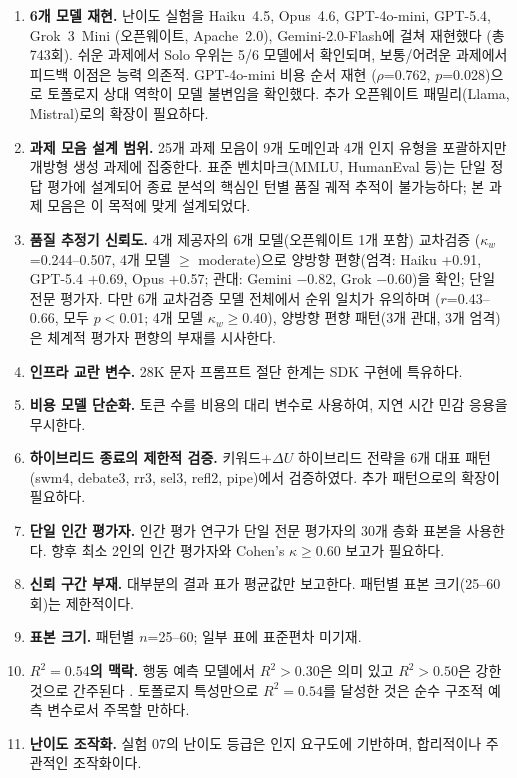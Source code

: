 \documentclass[a4paper,11pt]{article}
\begin{document}
\begin{enumerate}
\item \textbf{6개 모델 재현.} 난이도 실험을 Haiku~4.5, Opus~4.6, GPT-4o-mini, GPT-5.4, Grok~3~Mini (오픈웨이트, Apache~2.0), Gemini-2.0-Flash에 걸쳐 재현했다 (총 743회). 쉬운 과제에서 Solo 우위는 5/6 모델에서 확인되며, 보통/어려운 과제에서 피드백 이점은 능력 의존적. GPT-4o-mini 비용 순서 재현 ($\rho$=0.762, $p$=0.028)으로 토폴로지 상대 역학이 모델 불변임을 확인했다. 추가 오픈웨이트 패밀리(Llama, Mistral)로의 확장이 필요하다.

\item \textbf{과제 모음 설계 범위.} 25개 과제 모음이 9개 도메인과 4개 인지 유형을 포괄하지만 개방형 생성 과제에 집중한다. 표준 벤치마크(MMLU, HumanEval 등)는 단일 정답 평가에 설계되어 종료 분석의 핵심인 턴별 품질 궤적 추적이 불가능하다; 본 과제 모음은 이 목적에 맞게 설계되었다.

\item \textbf{품질 추정기 신뢰도.} 4개 제공자의 6개 모델(오픈웨이트 1개 포함) 교차검증 ($\kappa_w$=0.244--0.507, 4개 모델 $\geq$ moderate)으로 양방향 편향(엄격: Haiku +0.91, GPT-5.4 +0.69, Opus +0.57; 관대: Gemini $-$0.82, Grok $-$0.60)을 확인; 단일 전문 평가자. 다만 6개 교차검증 모델 전체에서 순위 일치가 유의하며 ($r$=0.43--0.66, 모두 $p<$0.01; 4개 모델 $\kappa_w \geq 0.40$), 양방향 편향 패턴(3개 관대, 3개 엄격)은 체계적 평가자 편향의 부재를 시사한다.

\item \textbf{인프라 교란 변수.} 28K 문자 프롬프트 절단 한계는 SDK 구현에 특유하다.

\item \textbf{비용 모델 단순화.} 토큰 수를 비용의 대리 변수로 사용하여, 지연 시간 민감 응용을 무시한다.

\item \textbf{하이브리드 종료의 제한적 검증.} 키워드+$\Delta U$ 하이브리드 전략을 6개 대표 패턴(swm4, debate3, rr3, sel3, refl2, pipe)에서 검증하였다. 추가 패턴으로의 확장이 필요하다.

\item \textbf{단일 인간 평가자.} 인간 평가 연구가 단일 전문 평가자의 30개 층화 표본을 사용한다. 향후 최소 2인의 인간 평가자와 Cohen's $\kappa \geq 0.60$ 보고가 필요하다.

\item \textbf{신뢰 구간 부재.} 대부분의 결과 표가 평균값만 보고한다. 패턴별 표본 크기(25--60회)는 제한적이다.

\item \textbf{표본 크기.} 패턴별 $n$=25--60; 일부 표에 표준편차 미기재.

\item \textbf{$R^{2}=0.54$의 맥락.} 행동 예측 모델에서 $R^{2}>0.30$은 의미 있고 $R^{2}>0.50$은 강한 것으로 간주된다 \citep{cohen1988}. 토폴로지 특성만으로 $R^{2}=0.54$를 달성한 것은 순수 구조적 예측 변수로서 주목할 만하다.

\item \textbf{난이도 조작화.} 실험 07의 난이도 등급은 인지 요구도에 기반하며, 합리적이나 주관적인 조작화이다.
\end{enumerate}
\end{document}

